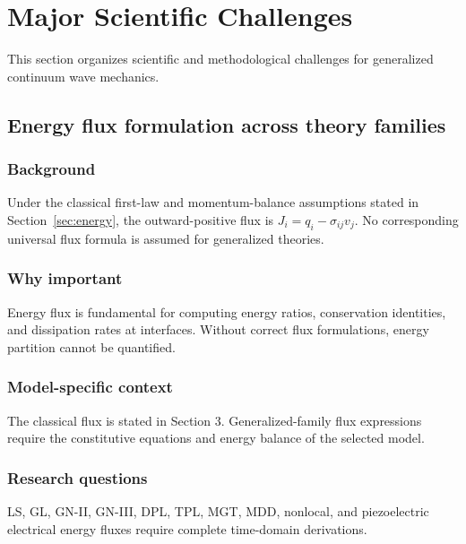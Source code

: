 \section{Major Scientific Challenges}
\label{sec:challenges}

This section organizes scientific and methodological challenges for generalized continuum wave mechanics.

\subsection{Energy flux formulation across theory families}
\label{sec:15.1}

\subsubsection{Background}

Under the classical first-law and momentum-balance assumptions stated in Section~\ref{sec:energy}, the outward-positive flux is $J_i=q_i-\sigma_{ij}v_j$. No corresponding universal flux formula is assumed for generalized theories.

\subsubsection{Why important}

Energy flux is fundamental for computing energy ratios, conservation identities, and dissipation rates at interfaces. Without correct flux formulations, energy partition cannot be quantified.

\subsubsection{Model-specific context}

The classical flux is stated in Section 3. Generalized-family flux expressions require the constitutive equations and energy balance of the selected model.

\subsubsection{Research questions}

LS, GL, GN-II, GN-III, DPL, TPL, MGT, MDD, nonlocal, and piezoelectric electrical energy fluxes require complete time-domain derivations.

